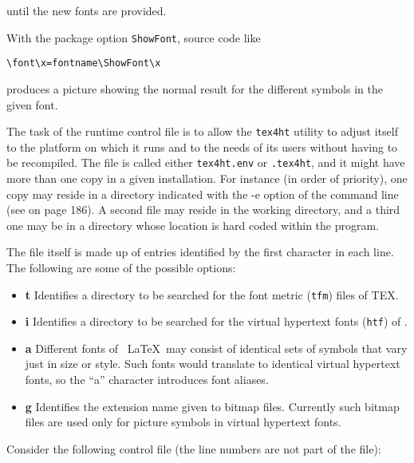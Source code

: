until the new fonts are provided. 

With the package option \verb|ShowFont|, source code like 

\begin{lstlisting}
\font\x=fontname\ShowFont\x 
\end{lstlisting}

produces a picture showing the normal result for the different symbols in the given 
font. 
 
 

The task of the runtime control file is to allow the \verb|tex4ht| utility to
adjust itself to the platform on which it runs and to the needs of its users
without having to be recompiled. The file is called either \verb|tex4ht.env| or
\verb|.tex4ht|, and it might have more than one copy in a given installation.
For instance (in order of priority), one copy may reside in a directory
indicated with the -e option of the command line (see  on page
186). A second file may reside in the working directory, and a third one may be
in a directory whose location is hard coded within the program. 

The file itself is made up of entries identified by the first character in each line. 
The following are some of the possible options: 

\begin{itemize}
  \item \textbf{t} Identifies a directory to be searched for the font metric (\verb|tfm|) files of TEX. 
  \item \textbf{i} Identifies a directory to be searched for the virtual hypertext fonts (\verb|htf|) of 
    \texht. 
  \item \textbf{a} Different fonts of \ \LaTeX\  may consist of identical sets of symbols that vary just 
    in size or style. Such fonts would translate to identical virtual hypertext fonts, 
    so the ``a'' character introduces font aliases. 
  \item \textbf{g} Identifies the extension name given to bitmap files. Currently such bitmap files 
    are used only for picture symbols in virtual hypertext fonts. 
\end{itemize}

Consider the following control file (the line numbers are not part of the file): 

